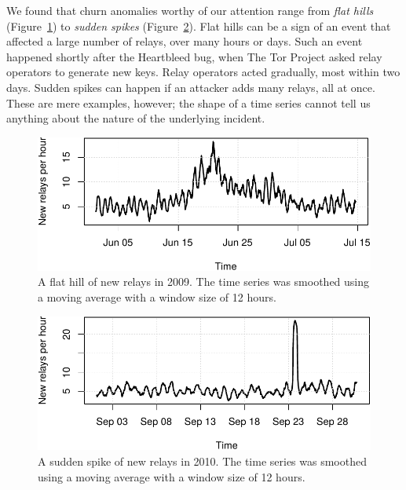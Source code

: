 We found that churn anomalies worthy of our attention range from \emph{flat
hills} (Figure~\ref{fig:flat-hill}) to \emph{sudden spikes}
(Figure~\ref{fig:sudden-spike}).  Flat hills can be a sign of an event that
affected a large number of relays, over many hours or days.  Such an event
happened shortly after the Heartbleed bug, when The Tor Project asked relay
operators to generate new keys.  Relay operators acted gradually, most within
two days.  Sudden spikes can happen if an attacker adds many relays, all at
once.  These are mere examples, however; the shape of a time series cannot tell
us anything about the nature of the underlying incident.

\begin{figure}[t]
	\centering
	\includegraphics[width=\linewidth]{diagrams/flat-hill.pdf}
	\caption{A flat hill of new relays in 2009.  The time series was smoothed
	using a moving average with a window size of 12 hours.}
	\label{fig:flat-hill}
\end{figure}

\begin{figure}[t]
	\centering
	\includegraphics[width=\linewidth]{diagrams/sudden-spike.pdf}
	\caption{A sudden spike of new relays in 2010.  The time series was smoothed
	using a moving average with a window size of 12 hours.}
	\label{fig:sudden-spike}
\end{figure}

